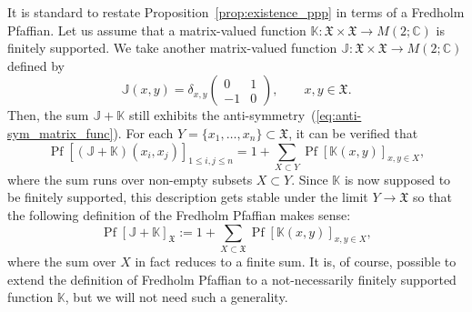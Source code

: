 \documentclass[pdftex]{sigma}
\numberwithin{equation}{section}
\newcommand{\pf}{\operatorname{Pf}}
\newcommand{\mfrak}[1]{\mathfrak{#1}}
\newcommand{\mbb}[1]{\mathbb{#1}}
\begin{document}
It is standard to restate Proposition~\ref{prop:existence_ppp} in terms of a Fredholm Pfaffian. Let us assume that a matrix-valued function $\mbb{K}\colon \mfrak{X}\times\mfrak{X}\to M(2;\mbb{C})$ is finitely supported. We take another matrix-valued function $\mbb{J}\colon \mfrak{X}\times\mfrak{X}\to M(2;\mbb{C})$ defined by
\begin{equation*}
	\mbb{J}(x,y)=\delta_{x,y}\left(
	\begin{matrix}
	0 & 1 \\
	-1 & 0
	\end{matrix}
	\right),\qquad x,y\in\mfrak{X}.
\end{equation*}
Then, the sum $\mbb{J}+\mbb{K}$ still exhibits the anti-symmetry~(\ref{eq:anti-sym_matrix_func}).
For each $Y=\{x_{1},\dots,x_{n}\}\subset\mfrak{X}$, it can be verified that~\cite{Rains2000}
\begin{equation*}
	\pf [(\mbb{J}+\mbb{K})(x_{i},x_{j}) ]_{1\le i,j\le n}=1+\sum_{X\subset Y}\pf [\mbb{K}(x,y) ]_{x,y\in X},
\end{equation*}
where the sum runs over non-empty subsets $X\subset Y$. Since $\mbb{K}$ is now supposed to be finitely supported, this description gets stable under the limit $Y \to \mfrak{X}$ so that the following definition of the Fredholm Pfaffian makes sense:
\begin{equation*}
	\pf [\mbb{J}+\mbb{K} ]_{\mfrak{X}}:=1+\sum_{X\subset\mfrak{X}}\pf [\mbb{K}(x,y) ]_{x,y\in X},
\end{equation*}
where the sum over $X$ in fact reduces to a finite sum. It is, of course, possible to extend the definition of Fredholm Pfaffian to a not-necessarily finitely supported function $\mbb{K}$, but we will not need such a generality.
\end{document}
